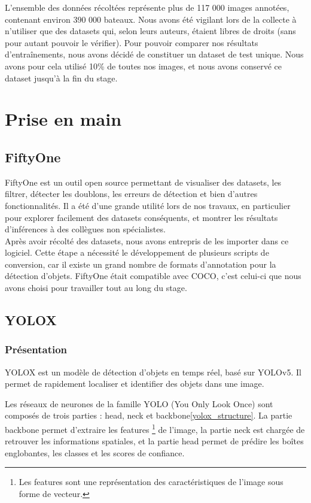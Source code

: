 L'ensemble des données récoltées représente plus de 117 000 images annotées, contenant environ 390 000 bateaux.
Nous avons été vigilant lors de la collecte à n'utiliser que des datasets qui, selon leurs auteurs,
étaient libres de droits (sans pour autant pouvoir le vérifier).
Pour pouvoir comparer nos résultats d'entraînements, nous avons décidé de constituer un dataset
de test unique. Nous avons pour cela utilisé 10\% de toutes nos images, et nous avons conservé ce dataset
jusqu'à la fin du stage.

\section{Prise en main}

\subsection{FiftyOne}\label{fiftyone}

FiftyOne est un outil open source permettant de visualiser des datasets, les filtrer,
détecter les doublons, les erreurs de détection et bien d'autres fonctionnalités.
Il a été d'une grande utilité lors de nos travaux, en particulier pour explorer facilement
des datasets conséquents, et montrer les résultats d'inférences
à des collègues non spécialistes.\\

Après avoir récolté des datasets, nous avons entrepris de les importer dans ce logiciel. Cette étape a
nécessité le développement de plusieurs scripts de conversion, car il existe un grand nombre de formats
d'annotation pour la détection d'objets. FiftyOne était compatible avec COCO, c'est celui-ci que nous
avons choisi pour travailler tout au long du stage.\\

\subsection{YOLOX}\label{yolox}

\subsubsection{Présentation}

YOLOX\cite{Ge_Liu_Wang_Li_Sun_2021} est un modèle de détection d'objets en temps réel, basé sur YOLOv5. Il permet de rapidement
localiser et identifier des objets dans une image.

Les réseaux de neurones de la famille YOLO (You Only Look Once) sont composés de trois parties
\cite{Redmon_Farhadi_2018} : head, neck et backbone\ref{yolox_structure}.
La partie backbone permet d'extraire les features \footnote{Les features sont une représentation des
caractéristiques de l'image sous forme de vecteur.} de l'image, la partie neck est chargée de retrouver les informations spatiales,
et la partie head permet de prédire les boîtes englobantes, les classes et les scores de confiance.\\

